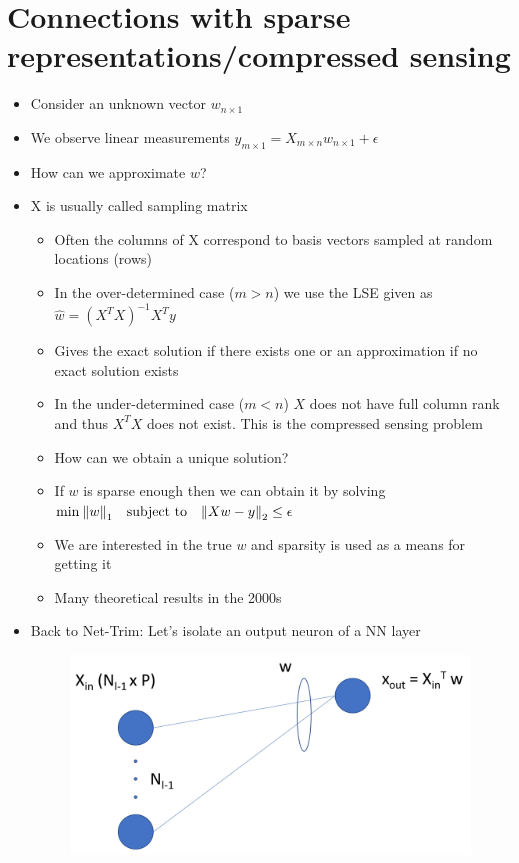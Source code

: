 \section{Connections with sparse representations/compressed sensing}
\begin{itemize}
	\item Consider an unknown vector $w_{n\times 1}$
	\item We observe linear measurements $y_{m\times 1} = X_{m\times n}w_{n\times 1}+\epsilon$
	\item How can we approximate $w$?
	\item X is usually called sampling matrix
	\begin{itemize}
		\item Often the columns of X correspond to basis vectors sampled at random locations (rows)
		\item In the over-determined case ($m>n$) we use the LSE given as $\hat{w} = (X^TX)^{-1}X^Ty$
		\item Gives the exact solution if there exists one or an approximation if no exact solution exists
		\item In the under-determined case ($m<n$) $X$ does not have full column rank and thus $X^TX$ does not exist. This is the compressed sensing problem
		\item How can we obtain a unique solution? 
		\item If $w$ is sparse enough then we can obtain it by solving $\min_{}\norm{w}_1 \quad \text{subject to} \quad \norm{Xw - y}_2 \leq \epsilon $
		\item We are interested in the true $w$ and sparsity is used as a means for getting it	
		\item Many theoretical results in the 2000s	
	\end{itemize}
	\item Back to Net-Trim: Let's isolate an output neuron of a NN layer
	\begin{figure}[H]
	\centering
	\includegraphics[width=.7\linewidth]{./figs/FFN_3.jpg}  
	\caption*{}

\end{figure}
\end{itemize}
